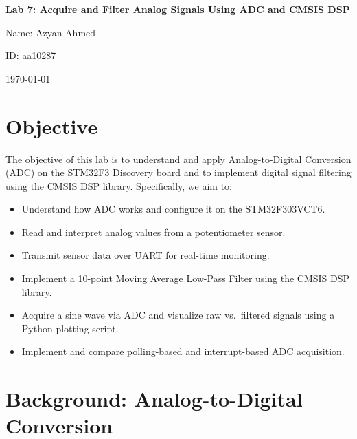 \documentclass[12pt,a4paper]{article}
\begin{document}
\begin{titlepage}
    \centering
    \vspace*{2cm}

    {\LARGE \textbf{Lab 7: Acquire and Filter Analog Signals Using ADC and CMSIS DSP}}\par
    \vspace{1.5cm}

    {\large Name: Azyan Ahmed}\par
    \vspace{0.5cm}
    {\large ID: aa10287}\par
    \vspace{0.5cm}
    {\large \today}\par

    \vfill
\end{titlepage}

\section{Objective}
The objective of this lab is to understand and apply Analog-to-Digital Conversion (ADC) on the STM32F3 Discovery board and to implement digital signal filtering using the CMSIS DSP library. Specifically, we aim to:
\begin{itemize}
    \item Understand how ADC works and configure it on the STM32F303VCT6.
    \item Read and interpret analog values from a potentiometer sensor.
    \item Transmit sensor data over UART for real-time monitoring.
    \item Implement a 10-point Moving Average Low-Pass Filter using the CMSIS DSP library.
    \item Acquire a sine wave via ADC and visualize raw vs.\ filtered signals using a Python plotting script.
    \item Implement and compare polling-based and interrupt-based ADC acquisition.
\end{itemize}

\section{Background: Analog-to-Digital Conversion}
\end{document}
